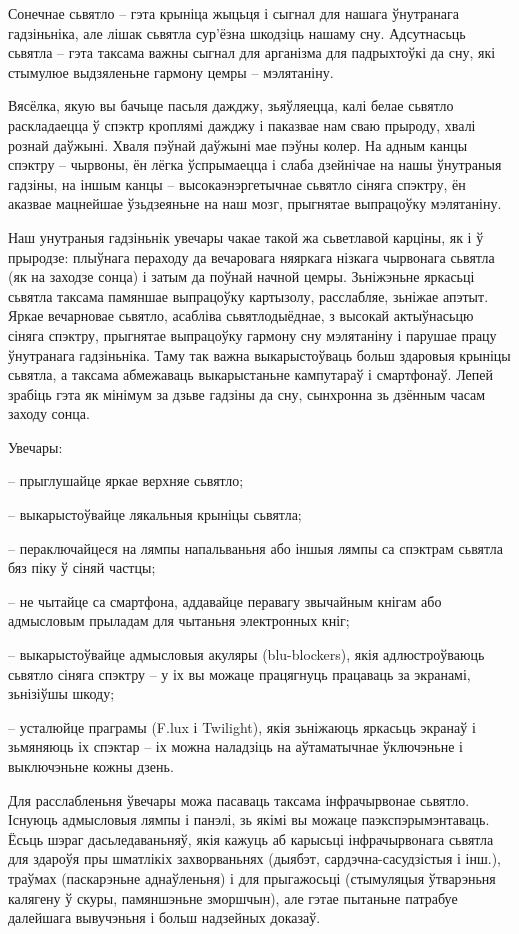 Сонечнае сьвятло – гэта крыніца жыцьця і сыгнал для нашага ўнутранага гадзіньніка, але лішак сьвятла сур'ёзна шкодзіць нашаму сну. Адсутнасьць сьвятла – гэта таксама важны сыгнал для арганізма для падрыхтоўкі да сну, які стымулюе выдзяленьне гармону цемры – мэлятаніну.

Вясёлка, якую вы бачыце пасьля дажджу, зьяўляецца, калі белае сьвятло раскладаецца ў спэктр кроплямі дажджу і паказвае нам сваю прыроду, хвалі рознай даўжыні. Хваля пэўнай даўжыні мае пэўны колер. На адным канцы спэктру – чырвоны, ён лёгка ўспрымаецца і слаба дзейнічае на нашы ўнутраныя гадзіны, на іншым канцы – высокаэнэргетычнае сьвятло сіняга спэктру, ён аказвае мацнейшае ўзьдзеяньне на наш мозг, прыгнятае выпрацоўку мэлятаніну.

Наш унутраныя гадзіньнік увечары чакае такой жа сьветлавой карціны, як і ў прыродзе: плыўнага пераходу да вечаровага няяркага нізкага чырвонага сьвятла (як на заходзе сонца) і затым да поўнай начной цемры. Зьніжэньне яркасьці сьвятла таксама памяншае выпрацоўку картызолу, расслабляе, зьніжае апэтыт. Яркае вечарновае сьвятло, асабліва сьвятлодыёднае, з высокай актыўнасьцю сіняга спэктру, прыгнятае выпрацоўку гармону сну мэлятаніну і парушае працу ўнутранага гадзіньніка. Таму так важна выкарыстоўваць больш здаровыя крыніцы сьвятла, а таксама абмежаваць выкарыстаньне кампутараў і смартфонаў. Лепей зрабіць гэта як мінімум за дзьве гадзіны да сну, сынхронна зь дзённым часам заходу сонца.

Увечары:

– прыглушайце яркае верхняе сьвятло;

– выкарыстоўвайце лякальныя крыніцы сьвятла;

– пераключайцеся на лямпы напальваньня або іншыя лямпы са спэктрам сьвятла бяз піку ў сіняй частцы;

– не чытайце са смартфона, аддавайце перавагу звычайным кнігам або адмысловым прыладам для чытаньня электронных кніг;

– выкарыстоўвайце адмысловыя акуляры (blu-blockers), якія адлюстроўваюць сьвятло сіняга спэктру – у іх вы можаце працягнуць працаваць за экранамі, зьнізіўшы шкоду;

– усталюйце праграмы (F.lux і Twilight), якія зьніжаюць яркасьць экранаў і зьмяняюць іх спэктар – іх можна наладзіць на аўтаматычнае ўключэньне і выключэньне кожны дзень.

Для расслабленьня ўвечары можа пасаваць таксама інфрачырвонае сьвятло. Існуюць адмысловыя лямпы і панэлі, зь якімі вы можаце паэкспэрымэнтаваць. Ёсьць шэраг дасьледаваньняў, якія кажуць аб карысьці інфрачырвонага сьвятла для здароўя пры шматлікіх захворваньнях (дыябэт, сардэчна-сасудзістыя і інш.), траўмах (паскарэньне аднаўленьня) і для прыгажосьці (стымуляцыя ўтварэньня калягену ў скуры, памяншэньне зморшчын), але гэтае пытаньне патрабуе далейшага вывучэньня і больш надзейных доказаў. 

